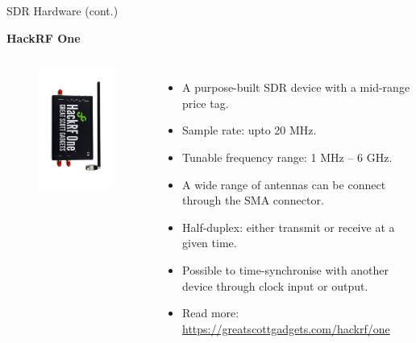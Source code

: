 \documentclass[handout]{beamer}
\begin{document}
\begin{frame}{SDR Hardware (cont.)}  

\footnotesize
\textbf{HackRF One}

\begin{columns}


	\begin{figure}
		\includegraphics[width=120pt]{figures/hackrf-one.jpg}
	\end{figure}


	\begin{itemize}
	\footnotesize
	\item A purpose-built SDR device with a mid-range price tag.
		\vspace{5pt}
	\item Sample rate: upto 20 MHz.
		\vspace{5pt}
	\item Tunable frequency range: 1 MHz -- 6 GHz.
		\vspace{5pt}
	\item A wide range of antennas can be connect through the SMA connector.
		\vspace{5pt}
	\item Half-duplex: either transmit or receive at a given time.
		\vspace{5pt}
	\item Possible to time-synchronise with another device through clock input or output.
		\vspace{5pt}
	\item Read more: \url{https://greatscottgadgets.com/hackrf/one}
	\end{itemize}


\end{columns}

\end{frame}
\end{document}
